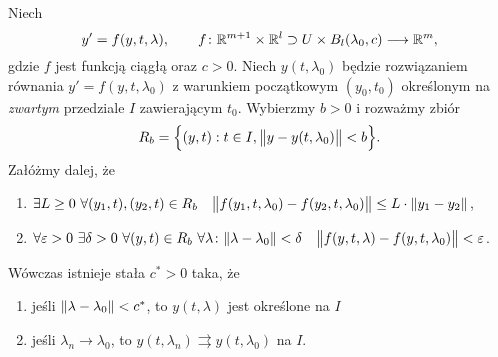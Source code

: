 
\begin{theorem}
  Niech
  \[
    y' = f(y,t,\lambda), \qquad
    f \colon \R^{m + 1} \times \R^l \supset U \times B_l(\lambda_0,c) \longrightarrow \R^m,
  \]
  gdzie $f$ jest funkcją ciągłą oraz $c > 0$. Niech $y(t,\lambda_0)$ będzie rozwiązaniem równania
  $y' = f(y,t,\lambda_0)$ z warunkiem początkowym $(y_0, t_0)$ określonym na \emph{zwartym}
  przedziale $I$ zawierającym $t_0$. Wybierzmy $b > 0$ i rozważmy zbiór 
  \[
    R_b = \Big\{ (y,t) : t \in I, \norm[\big]{ y - y(t,\lambda_0) } < b \Big\}.
  \]
  Załóżmy dalej, że
  \begin{enumerate}
    \item $\exists L \geq 0 \ \forall (y_1,t),(y_2,t) \in R_b \quad
    \norm[\big]{ f(y_1,t,\lambda_0) - f(y_2,t,\lambda_0) } \leq L \cdot \norm{y_1 - y_2}$,
    \item $\forall \varepsilon > 0 \ \exists \delta > 0 \ \forall (y,t) \in R_b
    \ \forall \lambda \colon \norm{\lambda - \lambda_0} < \delta \quad \norm[\big]{ f(y,t,\lambda) 
    - f(y,t,\lambda_0) } < \varepsilon$.
  \end{enumerate}
  Wówczas istnieje stała $c^{\ast} > 0$ taka, że
  \begin{enumerate}
    \item jeśli $\norm{\lambda - \lambda_0} < c^{\ast}$, to $y(t,\lambda)$ jest określone na $I$
    \item jeśli $\lambda_n \to \lambda_0$, to $y(t,\lambda_n) \rightrightarrows y(t,\lambda_0)$ na $I$.
  \end{enumerate}
\end{theorem}